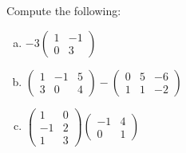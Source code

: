 \documentclass[11pt,letterpaper]{article}
\begin{document}
 Compute the following:
	\begin{enumerate}[(a)]
	\item $-3 \begin{pmatrix} 1 & -1 \\ 0 & 3 \end{pmatrix}$
	\item $\begin{pmatrix} 1 & -1 & 5 \\ 3 & 0 & 4 \end{pmatrix} - \begin{pmatrix} 0 & 5 & -6 \\ 1 & 1 & -2 \end{pmatrix}$
	\item $\begin{pmatrix} 1 & 0 \\ -1 & 2 \\ 1 & 3 \end{pmatrix} \begin{pmatrix} -1 & 4 \\ 0 & 1 \end{pmatrix}$
	\end{enumerate} \pspace
\end{document}
